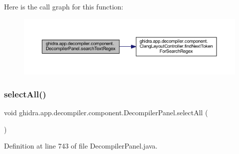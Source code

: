 Here is the call graph for this function\+:
\nopagebreak
\begin{figure}[H]
\begin{center}
\leavevmode
\includegraphics[width=350pt]{classghidra_1_1app_1_1decompiler_1_1component_1_1_decompiler_panel_a71b1d0c8a33c19608fb170244bfb96a3_cgraph}
\end{center}
\end{figure}
\mbox{\label{classghidra_1_1app_1_1decompiler_1_1component_1_1_decompiler_panel_a316699fe182bafdb7fcbe0e19a08e962}} 
\subsubsection{\texorpdfstring{selectAll()}{selectAll()}}
{\footnotesize\ttfamily void ghidra.\+app.\+decompiler.\+component.\+Decompiler\+Panel.\+select\+All (\begin{DoxyParamCaption}{ }\end{DoxyParamCaption})\hspace{0.3cm}{\ttfamily [inline]}}



Definition at line 743 of file Decompiler\+Panel.\+java.

